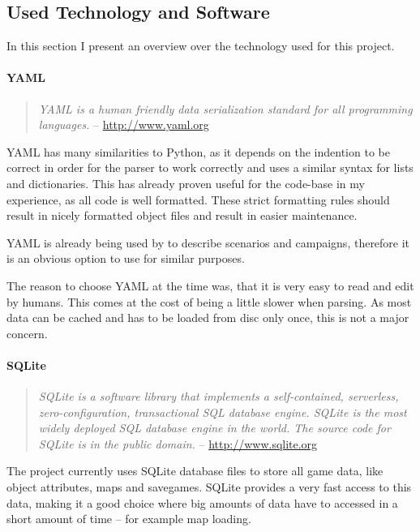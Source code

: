 \pagebreak

\subsection{Used Technology and Software}
In this section I present an overview over the technology used for this project.

\paragraph{YAML}
\begin{quote}
\textit{YAML is a human friendly data serialization standard for all programming languages.} -- \url{http://www.yaml.org}
\end{quote}
YAML has many similarities to Python, as it depends on the indention to be correct in order for the parser to work
correctly and uses a similar syntax for lists and dictionaries. This has already proven useful for the \UH{} code-base
in my experience, as all code is well formatted. These strict formatting rules should result in nicely formatted object
files and result in easier maintenance.

YAML is already being used by \UH{} to describe scenarios and campaigns, therefore it is an obvious option to use for
similar purposes.

The reason to choose YAML at the time was, that it is very easy to read and edit by humans. This comes at the cost of
being a little slower when parsing. As most data can be cached and has to be loaded from disc only once, this is not a
major concern.

\paragraph{SQLite}
\begin{quote}
\textit{SQLite is a software library that implements a self-contained, serverless, zero-configuration, transactional SQL
database engine. SQLite is the most widely deployed SQL database engine in the world. The source code for SQLite is in
the public domain.} -- \url{http://www.sqlite.org}
\end{quote}

The \UH{} project currently uses SQLite database files to store all game data, like object attributes, maps and
savegames. SQLite provides a very fast access to this data, making it a good choice where big amounts of data have to
accessed in a short amount of time -- for example map loading.

